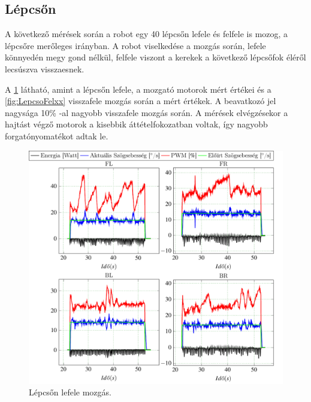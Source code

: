 \subsection{Lépcsőn}




\renewcommand{\GlobalPath}{Meresek/Mozgasok/Lepcso}
\renewcommand{\secondImage}{*} 

%

%


A következő mérések során a robot egy 40 \degree lépcsőn lefele és felfele is mozog, a lépcsőre merőleges irányban. A robot viselkedése a mozgás során, lefele könnyedén megy gond nélkül, felfele viszont a kerekek a következő lépcsőfok éléről lecsúszva visszaesnek.

A \ref{fig:LepcsoLexx} látható, amint a lépcsőn lefele, a mozgató motorok mért értékei és a \ref{fig:LepcsoFelxx} visszafele mozgás során a mért értékek. A beavatkozó jel nagysága 10\% -al  nagyobb visszafele mozgás során. A mérések elvégzésekor a hajtást végző motorok a kisebbik áttételfokozatban voltak, így nagyobb forgatónyomatékot adtak le.

\begin{figure}[H]
  \includegraphics{tikz/LepcsoLexx.pdf}
  \caption{Lépcsőn lefele mozgás.}
  \label{fig:LepcsoLexx}
\end{figure}

